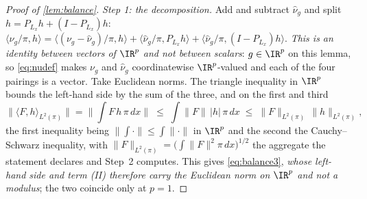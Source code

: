 \begin{proof}[Proof of \cref{lem:balance}]
\emph{Step 1: the decomposition.}
Add and subtract $\hat\nu_g$ and split $h=P_{L_x}h+(I-P_{L_x})h$:
$\langle\nu_g/\pi,h\rangle=\langle(\nu_g-\hat\nu_g)/\pi,h\rangle+\langle\hat\nu_g/\pi,P_{L_x}h\rangle+\langle\hat\nu_g/\pi,(I-P_{L_x})h\rangle$.
\emph{This is an identity between vectors of $\IR^{p}$ and not between scalars}: $g\in\IR^{p}$ on this
lemma, so \eqref{eq:nudef} makes $\nu_g$ and $\hat\nu_g$ coordinatewise $\IR^{p}$-valued and each of the
four pairings is a vector. Take Euclidean norms. The triangle inequality in $\IR^{p}$ bounds the
left-hand side by the sum of the three, and on the first and third
\[
\big\|\langle F,h\rangle_{L^{2}(\pi)}\big\|
=\Big\|\int F\,h\,\pi\,dx\Big\|
\;\le\;\int\|F\|\,|h|\,\pi\,dx
\;\le\;\|F\|_{L^{2}(\pi)}\,\|h\|_{L^{2}(\pi)} ,
\]
the first inequality being $\|\int\cdot\|\le\int\|\cdot\|$ in $\IR^{p}$ and the second the
Cauchy--Schwarz inequality, with $\|F\|_{L^{2}(\pi)}=\big(\int\|F\|^{2}\pi\,dx\big)^{1/2}$ the aggregate
the statement declares and Step~2 computes. This gives \eqref{eq:balance3}, \emph{whose left-hand side
and term \textup{(II)} therefore carry the Euclidean norm on $\IR^{p}$ and not a modulus}; the two
coincide only at $p=1$.


\end{proof}
